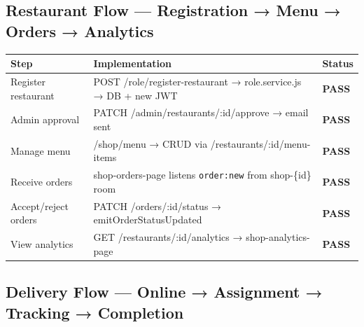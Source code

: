 \documentclass[11pt,a4paper]{article}
\newcommand{\PASS}{\colorbox{successgreen!20}{\color{successgreen}\bfseries\small PASS}}
\begin{document}
\subsection{Restaurant Flow — Registration → Menu → Orders → Analytics}

\begin{center}
\begin{tabularx}{0.9\textwidth}{@{}lXl@{}}
\toprule
\rowcolor{navyblue}\color{white}\bfseries Step & \color{white}\bfseries Implementation & \color{white}\bfseries Status \\
\midrule
Register restaurant  & POST /role/register-restaurant → role.service.js → DB + new JWT & \PASS \\
\rowcolor{rowalt}
Admin approval       & PATCH /admin/restaurants/:id/approve → email sent & \PASS \\
Manage menu          & /shop/menu → CRUD via /restaurants/:id/menu-items & \PASS \\
\rowcolor{rowalt}
Receive orders       & shop-orders-page listens \texttt{order:new} from shop-\{id\} room & \PASS \\
Accept/reject orders & PATCH /orders/:id/status → emitOrderStatusUpdated & \PASS \\
\rowcolor{rowalt}
View analytics       & GET /restaurants/:id/analytics → shop-analytics-page & \PASS \\
\bottomrule
\end{tabularx}
\end{center}

\subsection{Delivery Flow — Online → Assignment → Tracking → Completion}
\end{document}
